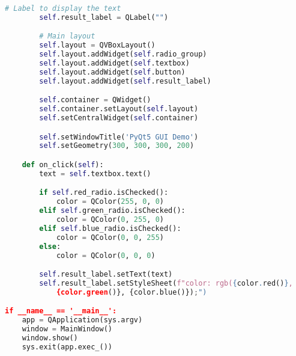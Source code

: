 \begin{lstlisting}[language=python]
        # Label to display the text
        self.result_label = QLabel("")

        # Main layout
        self.layout = QVBoxLayout()
        self.layout.addWidget(self.radio_group)
        self.layout.addWidget(self.textbox)
        self.layout.addWidget(self.button)
        self.layout.addWidget(self.result_label)

        self.container = QWidget()
        self.container.setLayout(self.layout)
        self.setCentralWidget(self.container)

        self.setWindowTitle('PyQt5 GUI Demo')
        self.setGeometry(300, 300, 300, 200)

    def on_click(self):
        text = self.textbox.text()

        if self.red_radio.isChecked():
            color = QColor(255, 0, 0)
        elif self.green_radio.isChecked():
            color = QColor(0, 255, 0)
        elif self.blue_radio.isChecked():
            color = QColor(0, 0, 255)
        else:
            color = QColor(0, 0, 0)

        self.result_label.setText(text)
        self.result_label.setStyleSheet(f"color: rgb({color.red()},
            {color.green()}, {color.blue()});")

if __name__ == '__main__':
    app = QApplication(sys.argv)
    window = MainWindow()
    window.show()
    sys.exit(app.exec_())
\end{lstlisting}
